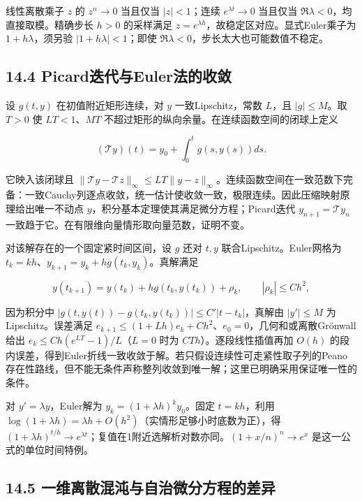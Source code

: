 \documentclass[11pt,a4paper]{article}
\begin{document}
线性离散乘子 \(z\) 的 \(z^n\to0\) 当且仅当 \(|z|<1\)；连续
\(e^{\lambda t}\to0\) 当且仅当 \(\Re\lambda<0\)，均直接取模。精确步长
\(h>0\) 的采样满足 \(z=e^{\lambda h}\)，故稳定区对应。显式Euler乘子为
\(1+h\lambda\)，须另验 \(|1+h\lambda|<1\)；即使
\(\Re\lambda<0\)，步长太大也可能数值不稳定。

\subsection{14.4
Picard迭代与Euler法的收敛}\label{picardux8fedux4ee3ux4e0eeulerux6cd5ux7684ux6536ux655b}

设 \(g(t,y)\) 在初值附近矩形连续，对 \(y\) 一致Lipschitz，常数 \(L\)，且
\(|g|\le M\)。取 \(T>0\) 使 \(LT<1\)、\(MT\)
不超过矩形的纵向余量。在连续函数空间的闭球上定义

\[
(\mathcal Ty)(t)=y_0+\int_0^tg(s,y(s))ds.
\]

它映入该闭球且
\(\|\mathcal Ty-\mathcal Tz\|_\infty\le LT\|y-z\|_\infty\)。连续函数空间在一致范数下完备：一致Cauchy列逐点收敛，统一估计使收敛一致，极限连续。因此压缩映射原理给出唯一不动点
\(y\)，积分基本定理使其满足微分方程；Picard迭代
\(y_{n+1}=\mathcal Ty_n\)
一致趋于它。在有限维向量情形取向量范数，证明不变。

对该解存在的一个固定紧时间区间，设 \(g\) 还对 \(t,y\)
联合Lipschitz。Euler网格为
\(t_k=kh\)、\(y_{k+1}=y_k+hg(t_k,y_k)\)。真解满足

\[
y(t_{k+1})=y(t_k)+hg(t_k,y(t_k))+\rho_k,\qquad |\rho_k|\le Ch^2,
\]

因为积分中 \(|g(t,y(t))-g(t_k,y(t_k))|\le C'|t-t_k|\)，真解由
\(|y'|\le M\) 为Lipschitz。误差满足
\(e_{k+1}\le(1+Lh)e_k+Ch^2\)、\(e_0=0\)，几何和或离散Grönwall给出
\(e_k\le Ch(e^{LT}-1)/L\)（\(L=0\) 时为 \(CT h\)）。逐段线性插值再加
\(O(h)\)
的段内误差，得到Euler折线一致收敛于解。若只假设连续性可走紧性取子列的Peano存在性路线，但不能无条件声称整列收敛到唯一解；这里已明确采用保证唯一性的条件。

对 \(y'=\lambda y\)，Euler解为 \(y_k=(1+\lambda h)^ky_0\)。固定
\(t=kh\)，利用
\(\log(1+\lambda h)=\lambda h+O(h^2)\)（实情形足够小时底数为正），得
\((1+\lambda h)^{t/h}\to e^{\lambda t}\)；复值在1附近选解析对数亦同。\((1+x/n)^n\to e^x\)
是这一公式的单位时间特例。

\subsection{14.5
一维离散混沌与自治微分方程的差异}\label{ux4e00ux7ef4ux79bbux6563ux6df7ux6c8cux4e0eux81eaux6cbbux5faeux5206ux65b9ux7a0bux7684ux5deeux5f02}
\end{document}
